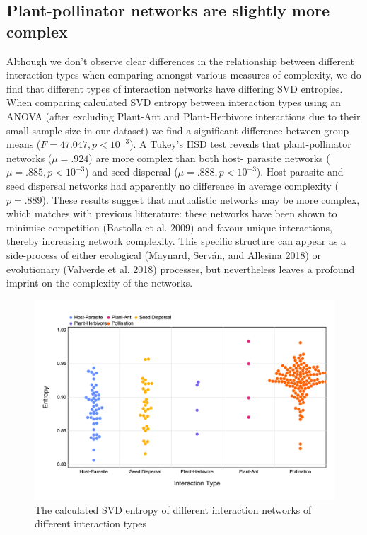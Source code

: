 \documentclass[11pt]{article}
\makeatletter
\def\maxwidth{\ifdim\Gin@nat@width>\linewidth\linewidth
\else\Gin@nat@width\fi}
\let\Oldincludegraphics\includegraphics
\renewcommand{\includegraphics}[1]{\Oldincludegraphics[width=\maxwidth]{#1}}
\makeatother
\begin{document}
\hypertarget{plant-pollinator-networks-are-slightly-more-complex}{%
\subsection{Plant-pollinator networks are slightly more
complex}\label{plant-pollinator-networks-are-slightly-more-complex}}

Although we don't observe clear differences in the relationship between
different interaction types when comparing amongst various measures of
complexity, we do find that different types of interaction networks have
differing SVD entropies. When comparing calculated SVD entropy between
interaction types using an ANOVA (after excluding Plant-Ant and
Plant-Herbivore interactions due to their small sample size in our
dataset) we find a significant difference between group means
(\(F = 47.047, p < 10^{-3}\)). A Tukey's HSD test reveals that
plant-pollinator networks (\(\mu = .924\)) are more complex than both
host- parasite networks (\(\mu = .885, p < 10^{-3}\)) and seed dispersal
(\(\mu = .888, p < 10^{-3}\)). Host-parasite and seed dispersal networks
had apparently no difference in average complexity (\(p = .889\)). These
results suggest that mutualistic networks may be more complex, which
matches with previous litterature: these networks have been shown to
minimise competition (Bastolla et al. 2009) and favour unique
interactions, thereby increasing network complexity. This specific
structure can appear as a side-process of either ecological (Maynard,
Serván, and Allesina 2018) or evolutionary (Valverde et al. 2018)
processes, but nevertheless leaves a profound imprint on the complexity
of the networks.

\begin{figure}
\hypertarget{fig:type}{%
\centering
\includegraphics{figures/interactiontype_v_entropy.png}
\caption{The calculated SVD entropy of different interaction networks of
different interaction types}\label{fig:type}
}
\end{figure}
\end{document}
